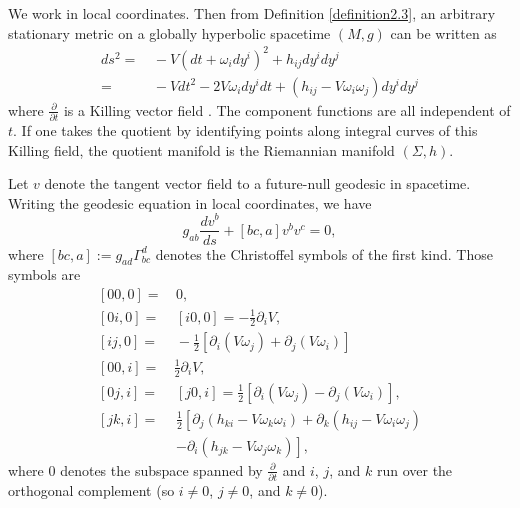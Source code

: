 \documentclass[12pt]{amsart}
\numberwithin{equation}{section}
\begin{document}
\noindent We work in local coordinates. Then from Definition \ref{definition2.3}, an arbitrary stationary metric on a globally hyperbolic spacetime $(M,g)$ can be written as
\begin{equation}
\label{eqA.1}
\begin{split}
ds^2 =&\, -V \left ( dt+\omega_idy^i\right )^2 +h_{ij}dy^idy^j\\
=&\,-Vdt^2-2V\omega_idy^idt+\left ( h_{ij}-V\omega_i\omega_j\right ) dy^idy^j
\end{split}
\end{equation}
where $\frac{\partial}{\partial t}$ is a Killing vector field \cite[Equation 4.3.3, p 149]{Chrusciel}. The component functions are all independent of $t$. If one takes the quotient by identifying points along integral curves of this Killing field, the quotient manifold is the Riemannian manifold $(\Sigma,h)$.

Let $v$ denote the tangent vector field to a future-null geodesic in spacetime. Writing the geodesic equation in local coordinates, we have
\begin{equation}
\label{eqA.2}
g_{ab}\frac{dv^b}{ds}+[bc,a]v^bv^c=0,
\end{equation}
where $[bc,a]:=g_{ad}\Gamma^d_{bc}$ denotes the Christoffel symbols of the first kind. Those symbols are
\begin{equation}
\label{eqA.3}
\begin{split}
[00,0]=&\, 0,\\
[0i,0]=&\, [i0,0]=-\frac12 \partial_i V,\\
[ij,0]=&\, -\frac12\left [ \partial_i \left ( V\omega_j\right ) +\partial_j \left (V\omega_i\right ) \right ]\\
[00,i]=& \frac12 \partial_i V,\\
[0j,i]=&\, [j0,i]=\frac12\left [ \partial_i \left ( V\omega_j\right ) -\partial_j \left ( V\omega_i \right ) \right ],\\
[jk,i]=&\, \frac12 \left [ \partial_j \left ( h_{ki} -V\omega_k\omega_i\right ) +\partial_k \left ( h_{ij} -V\omega_i\omega_j \right )\right . \\
&\, \left . -\partial_i \left ( h_{jk} -V\omega_j\omega_k\right ) \right ],
\end{split}
\end{equation}
where $0$ denotes the subspace spanned by $\frac{\partial}{\partial t}$ and $i$, $j$, and $k$ run over the orthogonal complement (so $i\neq 0$, $j\neq 0$, and $k\neq 0$).
\end{document}
